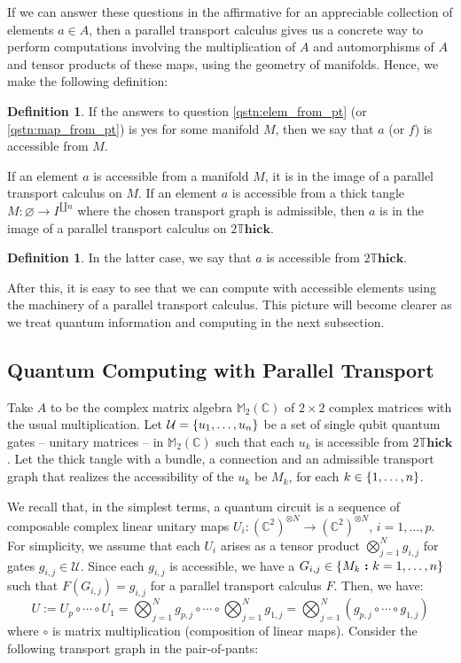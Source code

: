 \documentclass{amsart}
\newcommand{\M}{\mathbb{M}}
\newcommand{\C}{\mathbb{C}}
\newcommand{\tensor}{\otimes}
\renewcommand{\to}[1][]{\stackrel{#1}{\longrightarrow}}
\newcommand{\curly}[1]{\left\{ #1 \right\}}
\newcommand{\set}[2][]{\ifthenelse{\equal{#1}{}}
                                  {\curly{#2}}
                                  {\curly{#1\ \textbf{:}\ #2}}}
\newcommand{\DThick}{2\mathbb{T}\mathbf{hick}}
\numberwithin{thm}{section}
\theoremstyle{definition}
\newtheorem{defn}[thm]{Definition}
\begin{document}
If we can answer these questions in the affirmative for an appreciable
collection of elements $a \in A$, then a parallel transport calculus gives us a
concrete way to perform computations involving the multiplication of $A$ and
automorphisms of $A$ and tensor products of these maps, using the geometry of
manifolds. Hence, we make the following definition:

\begin{defn}
If the answers to question \ref{qstn:elem_from_pt} (or \ref{qstn:map_from_pt})
is yes for some manifold $M$, then we say that $a$ (or $f$) is accessible from
$M$.
\end{defn}

If an element $a$ is accessible from a manifold $M$, it is in the image of a
parallel transport calculus on $M$.
If an element $a$ is accessible from a thick tangle
$M : \varnothing \to I^{\amalg n}$ where the chosen transport graph is
admissible, then $a$ is in the image of a parallel transport calculus on $\DThick$.

\begin{defn}
In the latter case, we say that $a$ is accessible from $\DThick$.
\end{defn}

After this, it is easy to see
that we can compute with accessible elements using the machinery of a parallel
transport calculus. This picture will become clearer as we treat quantum information
and computing in the next subsection.

%

\subsection{Quantum Computing with Parallel Transport}

Take $A$ to be the complex matrix algebra $\M_2(\C)$ of $2 \times 2$ complex
matrices with the usual multiplication. Let
$\mathcal{U} = \set{u_1, \dots, u_n}$ be a set
of single qubit quantum gates -- unitary matrices -- in $\M_2(\C)$ such that
each $u_k$ is accessible from $\DThick$. Let the thick tangle with a bundle,
a connection and an admissible transport graph that realizes the accessibility
of the $u_k$ be $M_k$, for each $k \in \set{1, \dots, n}$.

We recall that, in the simplest terms, a quantum circuit is a sequence of
composable complex linear unitary maps
$U_i : (\C^2)^{\tensor N} \to (\C^2)^{\tensor N}$, $i = 1, \dots, p$.
For simplicity, we assume that
each $U_i$ arises as a tensor product $\bigotimes_{j = 1}^{N} g_{i, j}$ for
gates $g_{i, j} \in \mathcal{U}$. Since each $g_{i, j}$ is accessible, we have
a $G_{i, j} \in \set[M_k]{k = 1, \dots, n}$ such that $F(G_{i, j}) = g_{i, j}$
for a parallel transport calculus $F$. Then, we have:
\[
 U := U_p \circ \cdots \circ U_1
  = \bigotimes_{j = 1}^{N} g_{p, j} \circ \cdots
    \circ \bigotimes_{j = 1}^{N} g_{1, j}
  = \bigotimes_{j = 1}^{N} (g_{p, j} \circ \cdots \circ g_{1, j})
\]
where $\circ$ is matrix multiplication (composition of linear maps). Consider
the following transport graph in the pair-of-pants:
\end{document}
